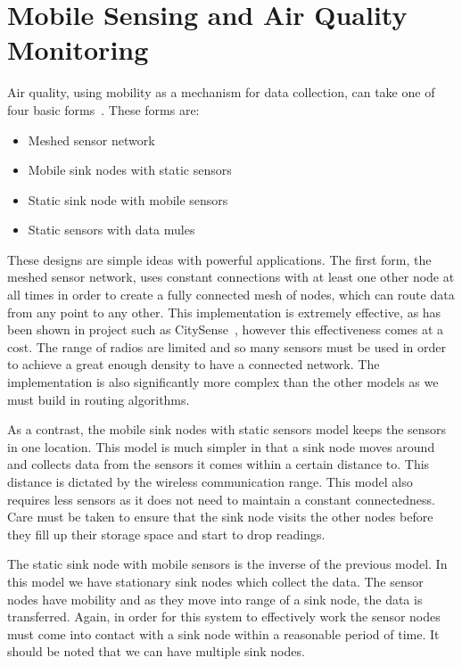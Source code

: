 \section{Mobile Sensing and Air Quality Monitoring}\label{background_mobile_sensing_models}

    Air quality, using mobility as a mechanism for data collection, can take one of four basic forms~\cite{datacollectionsurvey}. These forms are:

    \begin{itemize}
        \item Meshed sensor network
        \item Mobile sink nodes with static sensors
        \item Static sink node with mobile sensors
        \item Static sensors with data mules~\cite{datamulesthreeteir}
    \end{itemize}

    These designs are simple ideas with powerful applications. The first form, the meshed sensor network, uses constant connections with at least one other node at all times in order to create a fully connected mesh of nodes, which can route data from any point to any other. This implementation is extremely effective, as has been shown in project such as CitySense~\cite{citysense}, however this effectiveness comes at a cost. The range of radios are limited and so many sensors must be used in order to achieve a great enough density to have a connected network. The implementation is also significantly more complex than the other models as we must build in routing algorithms. 

    As a contrast, the mobile sink nodes with static sensors model keeps the sensors in one location. This model is much simpler in that a sink node moves around and collects data from the sensors it comes within a certain distance to. This distance is dictated by the wireless communication range. This model also requires less sensors as it does not need to maintain a constant connectedness. Care must be taken to ensure that the sink node visits the other nodes before they fill up their storage space and start to drop readings.

    The static sink node with mobile sensors is the inverse of the previous model. In this model we have stationary sink nodes which collect the data. The sensor nodes have mobility and as they move into range of a sink node, the data is transferred. Again, in order for this system to effectively work the sensor nodes must come into contact with a sink node within a reasonable period of time. It should be noted that we can have multiple sink nodes.


